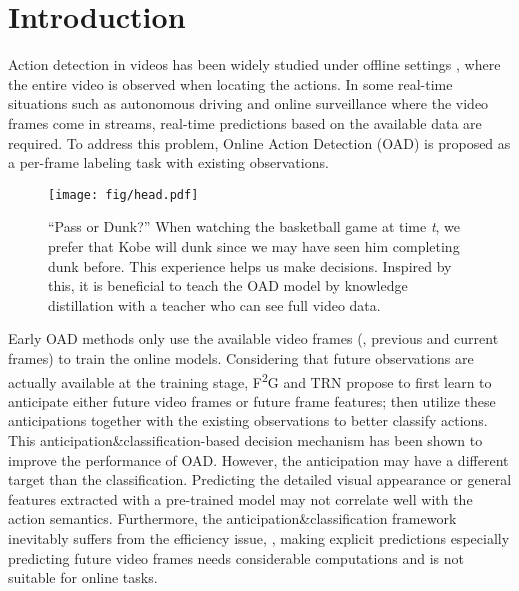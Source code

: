 \documentclass[final]{cvpr}
\begin{document}
\section{Introduction}

Action detection in videos has been widely studied under offline settings \cite{chao2018rethinking, lin2018bsn, lin2019bmn, liu2019multi, gao2020accurate, zhao2020bottom}, where the entire video is observed when locating the actions. In some real-time situations such as autonomous driving and online surveillance where the video frames come in streams, real-time predictions based on the available data are required. To address this problem, Online Action Detection (OAD) is proposed as a per-frame labeling task with existing observations. 
\begin{figure}[t]
\begin{center}
  \texttt{[image: fig/head.pdf]}
\end{center}
\caption{``Pass or Dunk?'' When watching the basketball game at time \textit{t}, we prefer that Kobe will dunk since we may have seen him completing dunk before. This experience helps us make decisions. Inspired by this, it is beneficial to teach the OAD model by knowledge distillation with a teacher who can see full video data. 
}
\label{fig:causalconv}
\end{figure}


Early OAD methods \cite{geest2016online, shou2018online} only use the available video frames (\ie, previous and current frames) to train the online models.
Considering that future observations are actually available at the training stage,  F\textsuperscript{2}G \cite{yoon2020a} and TRN \cite{xu2019trn} propose to first learn to anticipate either future video frames or future frame features; then utilize these anticipations together with the existing observations to better classify actions. This anticipation\&classification-based decision mechanism has been shown to improve the performance of OAD. However, the anticipation may have a different target than the classification. Predicting the detailed visual appearance or general features extracted with a pre-trained model may not correlate well with the action semantics. 
Furthermore, the anticipation\&classification framework inevitably suffers from the efficiency issue, \ie, making explicit predictions especially predicting future video frames needs considerable computations and is not suitable for online tasks. 
\end{document}
